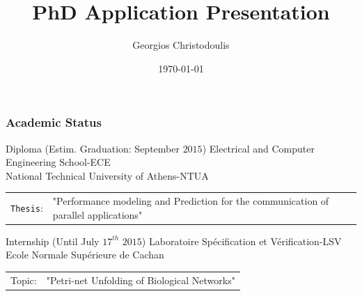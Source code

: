 \documentclass{beamer}
\title[George Christodoulis]{PhD Application Presentation} %
\author{Georgios Christodoulis} %
\institute[NTUA] %
{
National Technical University of Athens \\ %
\medskip
\textit{gchristodoulis@gmail.com} %
}
\date{\today} %
\begin{document}
\begin{frame}
\titlepage %
\end{frame}

\begin{frame}
\frametitle{Academic Status}
\begin{block}{Diploma (Estim. Graduation: September $2015$)}
Electrical and Computer Engineering School-ECE\\
National Technical University of Athens-NTUA\\
\begin{tabular}{p{30pt} p{200pt}}
\texttt{Thesis}: &"Performance modeling and Prediction for the communication of parallel applications"\\
\end{tabular}
\end{block}

\begin{block}{Internship (Until July $17^{th}$ $2015$)}
Laboratoire Spécification et Vérification-LSV\\
Ecole Normale Supérieure de Cachan\\
\begin{tabular}{l p{200pt}}
Topic:&"Petri-net Unfolding of Biological Networks"
\end{tabular}
\end{block}
\end{frame}
\end{document}
